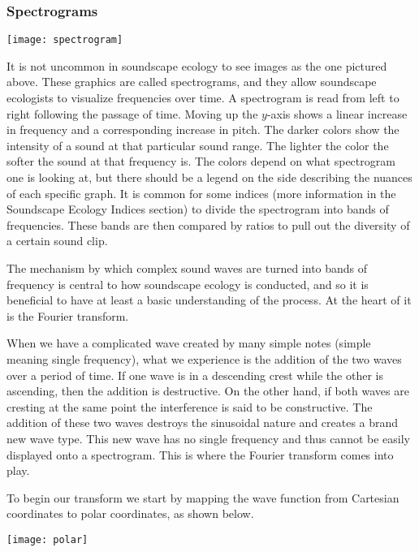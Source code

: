 \subsubsection{Spectrograms}
\begin{center}
  \texttt{[image: spectrogram]} \\[12pt]
\end{center}
It is not uncommon in soundscape ecology to see images as the one pictured above. These graphics are called spectrograms, and they allow soundscape ecologists to visualize frequencies over time. A spectrogram is read from left to right following the passage of time. Moving up the $y$-axis shows a linear increase in frequency and a corresponding increase in pitch. The darker colors show the intensity of a sound at that particular sound range. The lighter the color the softer the sound at that frequency is. The colors depend on what spectrogram one is looking at, but there should be a legend on the side describing the nuances of each specific graph. It is common for some indices (more information in the Soundscape Ecology Indices section) to divide the spectrogram into bands of frequencies. These bands are then compared by ratios to pull out the diversity of a certain sound clip.\par
The mechanism by which complex sound waves are turned into bands of frequency is central to how soundscape ecology is conducted, and so it is beneficial to have at least a basic understanding of the process. At the heart of it is the Fourier transform.\par
When we have a complicated wave created by many simple notes (simple meaning single frequency), what we experience is the addition of the two waves over a period of time. If one wave is in a descending crest while the other is ascending, then the addition is destructive. On the other hand, if both waves are cresting at the same point the interference is said to be constructive. The addition of these two waves destroys the sinusoidal nature and creates a brand new wave type. This new wave has no single frequency and thus cannot be easily displayed onto a spectrogram. This is where the Fourier transform comes into play.\par
To begin our transform we start by mapping the wave function from Cartesian coordinates to polar coordinates, as shown below.
\begin{center}
  \texttt{[image: polar]} \\[12pt]
\end{center} \cite{bluebrown}
